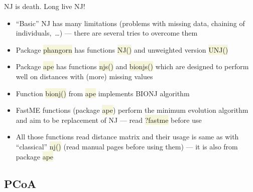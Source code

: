\documentclass[compress, ucs, xelatex, 11pt, xcolor=svgnames, aspectratio=169,
	hyperref={
		bookmarks=true,
		unicode=true,
		colorlinks=true,
		pdftitle={Molecular data in R},
		plainpages=false,
		pdfauthor={Vojtech Zeisek},
		pdfsubject={Course about phylogeny and evolution in R},
		pdfcreator={XeLaTeX},
		pdfkeywords={R, evolution, phylogeny, molecular data},
		linkcolor=Crimson, %
		anchorcolor=Magenta, %
		citecolor=Magenta, %
		filecolor=Magenta, %
		menucolor=Magenta, %
		urlcolor=DodgerBlue, %
		pdftex},
	url={hyphens, lowtilde} %
	]{beamer}
\renewcommand{\texttt}[1]{\colorbox{Beige}{{\ttfamily #1}}}
\begin{document}
\begin{frame}{NJ is death. Long live NJ!}
	\label{NJ-replacement}
	\begin{itemize}
		\item \enquote{Basic} NJ has many limitations (problems with missing data, chaining of individuals,~\ldots) --- there are several tries to overcome them
		\item Package \texttt{phangorn} has functions \texttt{NJ()} and unweighted version \texttt{UNJ()}
		\item Package \texttt{ape} has functions \texttt{njs()} and \texttt{bionjs()} which are designed to perform well on distances with (more) missing values
		\item Function \texttt{bionj()} from \texttt{ape} implements BIONJ algorithm
		\item FastME functions (package \texttt{ape}) perform the minimum evolution algorithm and aim to be replacement of NJ --- read \texttt{?fastme} before use
		\item All those functions read distance matrix and their usage is same as with \enquote{classical} \texttt{nj()} (read manual pages before using them) --- it is also from package \texttt{ape}
	\end{itemize}
\end{frame}

\subsection{PCoA}
\end{document}
